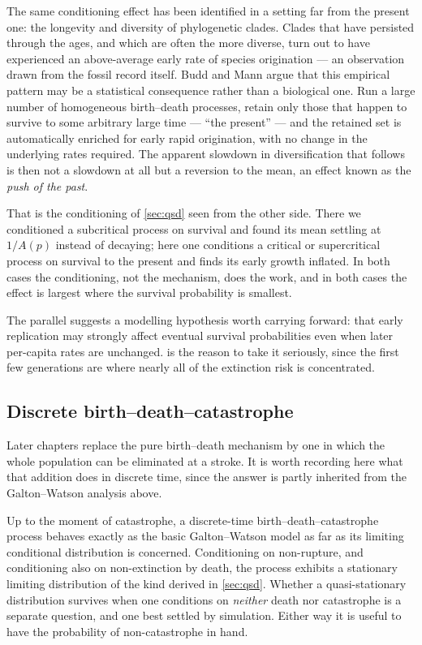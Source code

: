 The same conditioning effect has been identified in a setting far from the present one:
the longevity and diversity of phylogenetic clades. Clades that have persisted through
the ages, and which are often the more diverse, turn out to have experienced an
above-average early rate of species origination --- an observation drawn from the fossil
record itself. Budd and Mann \cite{Budd2018} argue that this empirical pattern may be a
statistical consequence rather than a biological one. Run a large number of homogeneous
birth--death processes, retain only those that happen to survive to some arbitrary large
time --- \enquote{the present} --- and the retained set is automatically enriched for
early rapid origination, with no change in the underlying rates required. The apparent
slowdown in diversification that follows is then not a slowdown at all but a reversion to
the mean, an effect known as the \emph{push of the past}.

That is the conditioning of \cref{sec:qsd} seen from the other side. There we conditioned
a subcritical process on survival and found its mean settling at $1/A(p)$ instead of
decaying; here one conditions a critical or supercritical process on survival to the
present and finds its early growth inflated. In both cases the conditioning, not the
mechanism, does the work, and in both cases the effect is largest where the survival
probability is smallest.

The parallel suggests a modelling hypothesis worth carrying forward: that early
replication may strongly affect eventual survival probabilities even when later
per-capita rates are unchanged.  is the reason to take it seriously,
since the first few generations are where nearly all of the extinction risk is
concentrated.

\subsection{Discrete birth--death--catastrophe}
\label{sec:bdc}

Later chapters replace the pure birth--death mechanism by one in which the whole
population can be eliminated at a stroke. It is worth recording here what that addition
does in discrete time, since the answer is partly inherited from the Galton--Watson
analysis above.

Up to the moment of catastrophe, a discrete-time birth--death--catastrophe process
behaves exactly as the basic Galton--Watson model as far as its limiting conditional
distribution is concerned. Conditioning on non-rupture, and conditioning also on
non-extinction by death, the process exhibits a stationary limiting distribution of the
kind derived in \cref{sec:qsd}. Whether a quasi-stationary distribution survives when one
conditions on \emph{neither} death nor catastrophe is a separate question, and one best
settled by simulation. Either way it is useful to have the probability of non-catastrophe
in hand.

